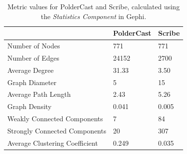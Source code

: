 \begin{table}
    \centering
    \begin{tabular}{|l | l | l |}
        \hline
        & PolderCast & Scribe \\ \hline
        \hline
        Number of Nodes & 771 & 771 \\ \hline
        Number of Edges & 24152 & 2700 \\ \hline
        Average Degree & 31.33 & 3.50 \\ \hline
        Graph Diameter & 5 & 15 \\ \hline
        Average Path Length & 2.43 & 5.26 \\ \hline
        Graph Density & 0.041 & 0.005 \\ \hline
        Weakly Connected Components & 7 & 84 \\ \hline
        Strongly Connected Components & 20 & 307 \\ \hline
        Average Clustering Coefficient & 0.249 & 0.035 \\ \hline

    \end{tabular}
    \caption{Metric values for PolderCast and Scribe, calculated using
        the \emph{Statistics Component} in Gephi.}
    \label{tab:struct_metrics}
\end{table}

